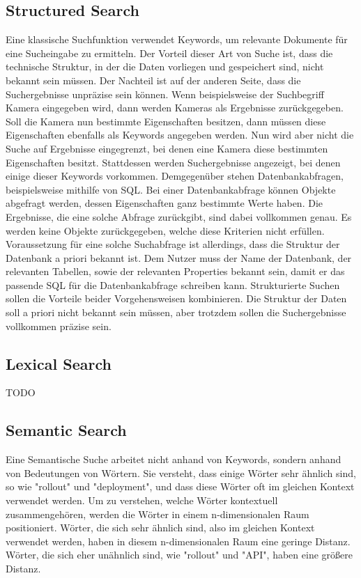 \subsection{Structured Search}
Eine klassische Suchfunktion verwendet Keywords, um relevante Dokumente für eine Sucheingabe zu ermitteln.
Der Vorteil dieser Art von Suche ist, dass die technische Struktur, in der die Daten vorliegen und gespeichert sind, nicht bekannt sein müssen.
Der Nachteil ist auf der anderen Seite, dass die Suchergebnisse unpräzise sein können.
Wenn beispielsweise der Suchbegriff Kamera eingegeben wird, dann werden Kameras als Ergebnisse zurückgegeben.
Soll die Kamera nun bestimmte Eigenschaften besitzen, dann müssen diese Eigenschaften ebenfalls als Keywords angegeben werden.
Nun wird aber nicht die Suche auf Ergebnisse eingegrenzt, bei denen eine Kamera diese bestimmten Eigenschaften besitzt.
Stattdessen werden Suchergebnisse angezeigt, bei denen einige dieser Keywords vorkommen.
Demgegenüber stehen Datenbankabfragen, beispielsweise mithilfe von SQL.
Bei einer Datenbankabfrage können Objekte abgefragt werden, dessen Eigenschaften ganz bestimmte Werte haben.
Die Ergebnisse, die eine solche Abfrage zurückgibt, sind dabei vollkommen genau.
Es werden keine Objekte zurückgegeben, welche diese Kriterien nicht erfüllen.
Voraussetzung für eine solche Suchabfrage ist allerdings, dass die Struktur der Datenbank a priori bekannt ist.
Dem Nutzer muss der Name der Datenbank, der relevanten Tabellen, sowie der relevanten Properties bekannt sein, damit er das passende SQL für die Datenbankabfrage schreiben kann.
Strukturierte Suchen sollen die Vorteile beider Vorgehensweisen kombinieren.
Die Struktur der Daten soll a priori nicht bekannt sein müssen, aber trotzdem sollen die Suchergebnisse vollkommen präzise sein.

\subsection{Lexical Search}
TODO

\subsection{Semantic Search}
Eine Semantische Suche arbeitet nicht anhand von Keywords, sondern anhand von Bedeutungen von Wörtern.
Sie versteht, dass einige Wörter sehr ähnlich sind, so wie "rollout" und "deployment", und dass diese Wörter oft im gleichen Kontext verwendet werden.
Um zu verstehen, welche Wörter kontextuell zusammengehören, werden die Wörter in einem n-dimensionalen Raum positioniert.
Wörter, die sich sehr ähnlich sind, also im gleichen Kontext verwendet werden, haben in diesem n-dimensionalen Raum eine geringe Distanz.
Wörter, die sich eher unähnlich sind, wie "rollout" und "API", haben eine größere Distanz.\\

